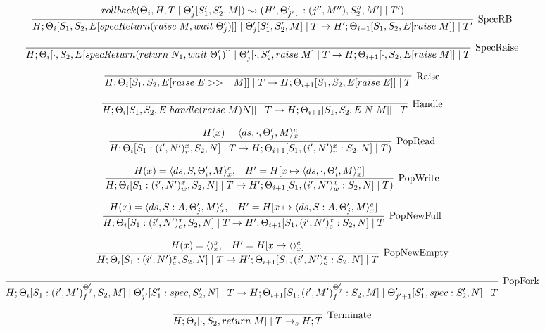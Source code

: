 \documentclass[9pt]{article}
\newcommand\specStep{\rightarrow_{s}}
\newcommand{\eval}[1]{E[#1]}
\begin{document}
\[%
\infer[\text{SpecRB}]{H; \Theta_i[S_1, S_2, \eval{specReturn(raise \; M, wait \; \Theta_j')}] \; | \; \Theta_j'[S_1', S_2', M] \; | \; T \rightarrow H'; \Theta_{i+1}[S_1, S_2, \eval{raise \; M}] \; | \; T'}{rollback(\Theta_i, H, T \; | \; \Theta_j'[S_1', S_2', M]) \leadsto (H', \Theta_{j'}'[\cdot : (j'', M''), S_2'', M'] \; | \; T')}
\]

\[%
\infer[\text{SpecRaise}]{H; \Theta_i[\cdot, S_2, \eval{specReturn(return \; N_1, wait \; \Theta_1')}] \; | \; \Theta_j'[\cdot, S_2', raise \; M] \; | \; T \rightarrow H; \Theta_{i+1}[\cdot, S_2, \eval{raise \; M}] \; | \; T}{}
\]

\[%
\infer[\text{Raise}]{H; \Theta_i[S_1, S_2, \eval{raise \; E >>= M}] \; | \; T \rightarrow H; \Theta_{i+1}[S_1, S_2, \eval{raise \; E}] \; | \; T}{}
\]

\[%
\infer[\text{Handle}]{H; \Theta_i[S_1, S_2, \eval{handle (raise \; M) N}] \; | \; T \rightarrow H; \Theta_{i+1}[S_1, S_2, \eval{N \; M}] \; | \; T}{}
\]

\[%
\infer[\text{PopRead}]{H; \Theta_i[S_1 : (i', N')_r^x, S_2, N] \; | \; T \rightarrow H; \Theta_{i+1}[S_1, (i', N')_r^x : S_2, N] \; | \; T)}{H(x) = \langle ds, \cdot, \Theta_j', M\rangle_x^c}
\]

\[%
\infer[\text{PopWrite}]{H; \Theta_i[S_1: (i', N')_w^x, S_2, N] \; | \; T \rightarrow H'; \Theta_{i+1}[S_1, (i', N')_w^x : S_2, N] \; | \; T)}{H(x) = \langle ds, S, \Theta_i', M\rangle_x^c, \;\;\; H' = H[x \mapsto \langle ds, \cdot, \Theta_i', M\rangle_x^c]}
\]

\[%
\infer[\text{PopNewFull}]{H; \Theta_i[S_1 : (i', N')_c^x, S_2, N] \; | \; T \rightarrow H';  \Theta_{i+1}[S_1, (i', N')_c^x : S_2, N] \; | \; T}{H(x) = \langle ds, S:A, \Theta_j', M \rangle_x^s, \;\;\; H' = H[x \mapsto \langle ds, S:A, \Theta_j', M\rangle_x^c]}
\]

\[%
\infer[\text{PopNewEmpty}]{H; \Theta_i[S_1 : (i', N')_c^x, S_2, N] \; | \; T \rightarrow H';  \Theta_{i+1}[S_1, (i', N')_c^x : S_2, N] \; | \; T}{H(x) = \langle \rangle_x^s, \;\;\; H' = H[x \mapsto \langle \rangle_x^c]}
\]

\[%
\infer[\text{PopFork}]{H; \Theta_i[S_1 : (i', M')_f^{\Theta_j'}, S_2, M] \; | \; \Theta_{j'}'[S_1' : spec, S_2', N] \; | \; T \rightarrow H; \Theta_{i+1}[S_1, (i', M')_f^{\Theta_j'} : S_2, M] \; | \; \Theta_{j' + 1}'[S_1', spec : S_2', N] \; | \; T}{}
\]

\[
\infer[\text{Terminate}]{H; \Theta_i[\cdot, S_2, return \; M] \; | \; T \specStep H; T}{}
\]
\end{document}
